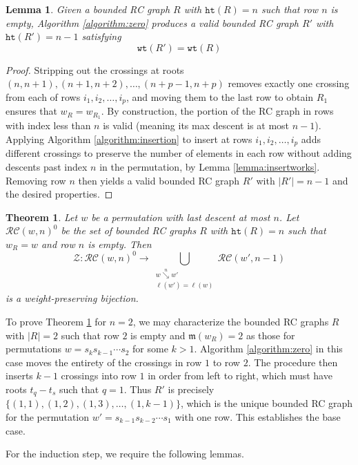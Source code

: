 \documentclass{amsart}
\newtheorem{lemma}{Lemma}[subsection]
\newtheorem{theorem}{Theorem}[section]
\theoremstyle{definition}
\theoremstyle{remark}
\numberwithin{equation}{subsection}
\newcommand{\downvar}[1]{\stackrel{#1}{\searrow}}
\newcommand{\wof}[1]{w_{#1}}
\newcommand{\wtt}{\mathtt{wt}}
\newcommand{\zeromap}{\mathcal{Z}}
\newcommand{\hr}{\mathtt{ht}}
\newcommand{\maxd}{\mathfrak{m}}
\begin{document}
\begin{lemma} \label{lemma:zeroweight}
Given a bounded RC graph $R$ with $\hr(R)=n$ such that row $n$ is empty, Algorithm \ref{algorithm:zero} produces a valid bounded RC graph $R'$ with $\hr(R')=n-1$ satisfying
$$\wtt(R') = \wtt(R)$$
\end{lemma}
\begin{proof}
	Stripping out the crossings at roots $(n, n+1), (n+1, n+2), \ldots, (n + p - 1, n + p)$ removes exactly one crossing from each of rows $i_1, i_2, \ldots, i_p$, and moving them to the last row to obtain $R_1$ ensures that $\wof{R}=\wof{R_1}$. By construction, the portion of the RC graph in rows with index less than $n$ is valid (meaning its max descent is at most $n-1$). Applying Algorithm \ref{algorithm:insertion} to insert at rows $i_1, i_2, \ldots, i_p$ adds different crossings to preserve the number of elements in each row without adding descents past index $n$ in the permutation, by Lemma \ref{lemma:insertworks}. Removing row $n$ then yields a valid bounded RC graph $R'$ with $|R'|=n-1$ and the desired properties. 
\end{proof}



\begin{theorem} \label{theorem:zero_bijection}
Let $w$ be a permutation with last descent at most $n$. Let $\mathcal{RC}(w,n)^0$ be the set of bounded RC graphs $R$ with $\hr(R)=n$ such that $\wof{R}=w$ and row $n$ is empty. Then
$$\zeromap:\mathcal{RC}(w, n)^{0}\to \bigcup_{\substack{w\downvar{n} w'\\\ell(w')=\ell(w)}}\mathcal{RC}(w', n-1)$$
is a weight-preserving bijection.
\end{theorem}

To prove Theorem \ref{theorem:zero_bijection} for $n=2$, we may characterize the bounded RC graphs $R$ with $|R|=2$ such that row $2$ is empty and $\maxd(\wof{R})=2$ as those for permutations $w=s_k s_{k-1}\cdots s_2$ for some $k>1$. Algorithm \ref{algorithm:zero} in this case moves the entirety of the crossings in row $1$ to row $2$. The procedure then inserts $k-1$ crossings into row $1$ in order from left to right, which must have roots $t_q - t_s$ such that $q=1$. Thus $R'$ is precisely $\{(1,1), (1,2), (1,3), \ldots, (1, k-1)\}$, which is the unique bounded RC graph for the permutation $w' = s_{k-1} s_{k-2}\cdots s_1$ with one row. This establishes the base case.

For the induction step, we require the following lemmas.
\end{document}

